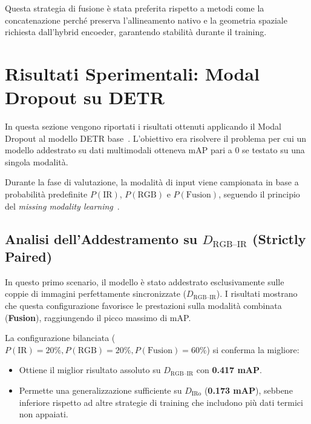 \documentclass[a4paper,12pt]{article}
\begin{document}
Questa strategia di fusione è stata preferita rispetto a metodi come la concatenazione perché preserva l'allineamento nativo e la geometria spaziale richiesta dall'hybrid encoeder, garantendo stabilità durante il training.

\newpage


\section{Risultati Sperimentali: Modal Dropout su DETR}

In questa sezione vengono riportati i risultati ottenuti applicando il Modal Dropout al modello DETR base~\cite{detr}. L'obiettivo era risolvere il problema per cui un modello addestrato su dati multimodali otteneva mAP pari a 0 se testato su una singola modalità.

Durante la fase di valutazione, la modalità di input viene campionata in base a probabilità predefinite $P(\text{IR})$, $P(\text{RGB})$ e $P(\text{Fusion})$, seguendo il principio del \emph{missing modality learning}~\cite{missing_modality}.

\subsection{Analisi dell'Addestramento su \texorpdfstring{$D_{\text{RGB--IR}}$}{D\_RGB-IR} (Strictly Paired)}

In questo primo scenario, il modello è stato addestrato esclusivamente sulle coppie di immagini perfettamente sincronizzate ($D_{\text{RGB--IR}}$). 
I risultati mostrano che questa configurazione favorisce le prestazioni sulla modalità combinata (\textbf{Fusion}), raggiungendo il picco massimo di mAP.

La configurazione bilanciata ($P(\text{IR})=20\%, P(\text{RGB})=20\%, P(\text{Fusion})=60\%$) si conferma la migliore:
\begin{itemize}
    \item Ottiene il miglior risultato assoluto su $D_{\text{RGB--IR}}$ con \textbf{0.417 mAP}.
    \item Permette una generalizzazione sufficiente su $D_{\text{IRo}}$ (\textbf{0.173 mAP}), sebbene inferiore rispetto ad altre strategie di training che includono più dati termici non appaiati.
\end{itemize}
\end{document}
